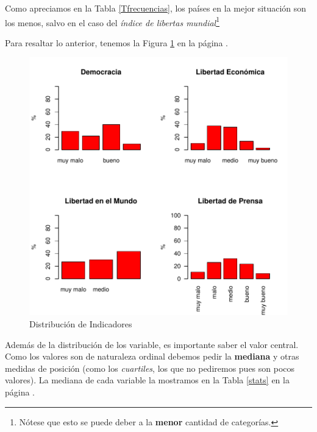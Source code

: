 \documentclass{article}
\begin{document}
Como apreciamos en la Tabla \ref{Tfrecuencias}, los países en la mejor situación son los menos, salvo en el caso del \emph{índice de libertas mundial}\footnote{Nótese que esto se puede deber a la {\bf menor} cantidad de categorías.}

\clearpage

Para resaltar lo anterior, tenemos la Figura \ref{barplots} en la página \pageref{barplots}. 


\begin{figure}[h]
\centering
\includegraphics{paperVersion_6-barplots}
\caption{Distribución de Indicadores}
\label{barplots}
\end{figure}

Además de la distribución de los variable, es importante saber el valor central. Como los valores son de naturaleza ordinal debemos pedir la {\bf mediana} y otras medidas de posición (como los \emph{cuartiles}, los que no pediremos pues son pocos valores). La mediana de cada variable la mostramos en la Tabla \ref{stats} en la página \pageref{stats}.
\end{document}
